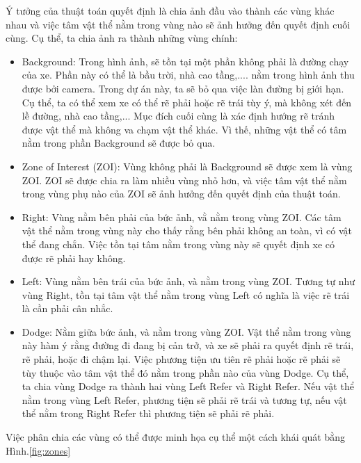 \documentclass[a4paper,10pt]{article}
\begin{document}
	Ý tưởng của thuật toán quyết định là chia ảnh đầu vào thành các vùng khác nhau và việc tâm vật thể nằm trong vùng nào sẽ ảnh hưởng đến quyết định cuối cùng. Cụ thể, ta chia ảnh ra thành những vùng chính:
	\begin{itemize}
		\item Background: Trong hình ảnh, sẽ tồn tại một phần không phải là đường chạy của xe. Phần này có thể là bầu trời, nhà cao tầng,.... nằm trong hình ảnh thu được bởi camera. Trong dự án này, ta sẽ bỏ qua việc làn đường bị giới hạn. Cụ thể, ta có thể xem xe có thể rẽ phải hoặc rẽ trái tùy ý, mà không xét đến lề đường, nhà cao tầng,... Mục đích cuối cùng là xác định hướng rẽ tránh được vật thể mà không va chạm vật thể khác. Vì thế, những vật thể có tâm nằm trong phần Background sẽ được bỏ qua.
		
		\item Zone of Interest (ZOI): Vùng không phải là Background sẽ được xem là vùng ZOI. ZOI sẽ được chia ra làm nhiều vùng nhỏ hơn, và việc tâm vật thể nằm trong vùng phụ nào của ZOI sẽ ảnh hưởng đến quyết định của thuật toán.
		
		\item Right: Vùng nằm bên phải của bức ảnh, vằ nằm trong vùng ZOI. Các tâm vật thể nằm trong vùng này cho thấy rằng bên phải không an toàn, vì có vật thể đang chắn. Việc tồn tại tâm nằm trong vùng này sẽ quyết định xe có được rẽ phải hay không.
		
		\item Left: Vùng nằm bên trái của bức ảnh, và nằm trong vùng ZOI. Tương tự như vùng Right, tồn tại tâm vật thể nằm trong vùng Left có nghĩa là việc rẽ trái là cần phải cân nhắc.
		
		\item Dodge: Nằm giữa bức ảnh, và nằm trong vùng ZOI. Vật thể nằm trong vùng này hàm ý rằng đường đi đang bị cản trở, và xe sẽ phải ra quyết định rẽ trái, rẽ phải, hoặc đi chậm lại. Việc phương tiện ưu tiên rẽ phải hoặc rẽ phải sẽ tùy thuộc vào tâm vật thể đó nằm trong phần nào của vùng Dodge. Cụ thể, ta chia vùng Dodge ra thành hai vùng Left Refer và Right Refer. Nếu vật thể nằm trong vùng Left Refer, phương tiện sẽ phải rẽ trái và tương tự, nếu vật thể nằm trong Right Refer thì phương tiện sẽ phải rẽ phải. 
	
	\end{itemize}		
Việc phân chia các vùng có thể được minh họa cụ thể một cách khái quát bằng Hình.\ref{fig:zones}
\end{document}
